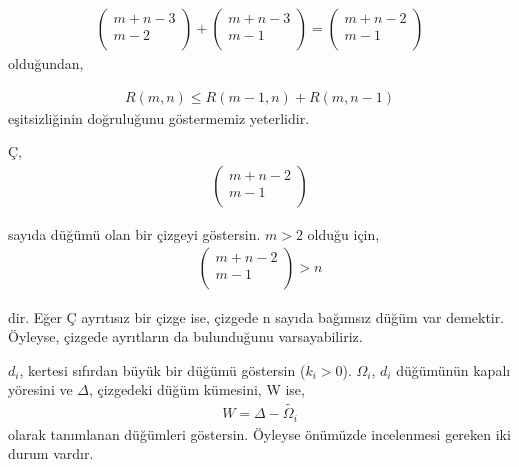\documentclass[11pt]{amsbook}
\begin{document}
\begin{align*}
\begin{pmatrix} 
m+n-3 \\
m-2 \\
\end{pmatrix}
+
\begin{pmatrix} 
m+n-3 \\
m-1 \\
\end{pmatrix}
=
\begin{pmatrix} 
m+n-2 \\
m-1 \\
\end{pmatrix}
\end{align*}
olduğundan,

\begin{align*}
R(m,n)  \leq  R(m-1, n) + R(m, n-1)
\end{align*}
eşitsizliğinin doğruluğunu göstermemiz yeterlidir.



Ç, \begin{align*}
\begin{pmatrix} 
m+n-2 \\
m-1 \\
\end{pmatrix}
\end{align*}

sayıda düğümü olan bir çizgeyi göstersin. $m>2$ olduğu için,
\begin{align*}
\begin{pmatrix} 
m+n-2 \\
m-1 \\
\end{pmatrix} >n 
\end{align*}

dir. Eğer Ç ayrıtısız bir çizge ise, çizgede n sayıda bağımsız düğüm var demektir. Öyleyse, çizgede ayrıtların da bulunduğunu varsayabiliriz.

$d_{i}$, kertesi sıfırdan büyük bir düğümü göstersin ($k_{i}>$0). $\Omega_{i}$, $d_{i}$ düğümünün kapalı yöresini ve $\Delta $, çizgedeki düğüm kümesini, W ise,
\begin{align*}
 W= \Delta  - \tilde{\Omega_{i}}
\end{align*}
olarak tanımlanan düğümleri göstersin. Öyleyse önümüzde incelenmesi gereken iki durum vardır.
\end{document}
